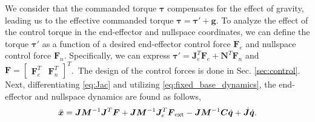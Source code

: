 \documentclass[../main.tex]{subfiles}
\begin{document}
We consider that the commanded torque ${\bm{\tau}}$ compensates for the effect of gravity, leading us to the effective commanded torque ${\bm{\tau}} =  {\bm{\tau}'} + \bm{g}$. To analyze the effect of the control torque in the end-effector and nullspace coordinates, we can define the torque $\bm{\tau}'$ as a function of a desired end-effector control force $\bm{F}_e$ and nullspace control force $\bm{F}_n$. Specifically, we can express $\bm{\tau}' = \bm{J}_e^T\bm{F}_e + \bm{N}^T \bm{F}_n$ and $\bm{F} = \begin{bmatrix} \bm{F}_e^T & \bm{F}_n^T\end{bmatrix}^T$. The design of the control forces is done in Sec. \ref{sec:control}. Next, differentiating  \eqref{eq:Jac} and utilizing \eqref{eq:fixed_base_dynamics}, the end-effector and nullspace dynamics are found as follows,
\begin{equation}
    \label{eq:dyn_ee_2}
   \ddot{\bm{x}}
    = \bm{J} \bm{M}^{-1}\bm{J}^{T} \bm{F}
    + \bm{J} \bm{M}^{-1}\bm{J}_e^{T}\bm{{F}}_{\rm ext}  -  \bm{J} \bm{M}^{-1}\bm{C}\dot{\bm{q}}
    +\dot{\bm{J}} \dot{\bm{q}}.
\end{equation} \par
\end{document}

